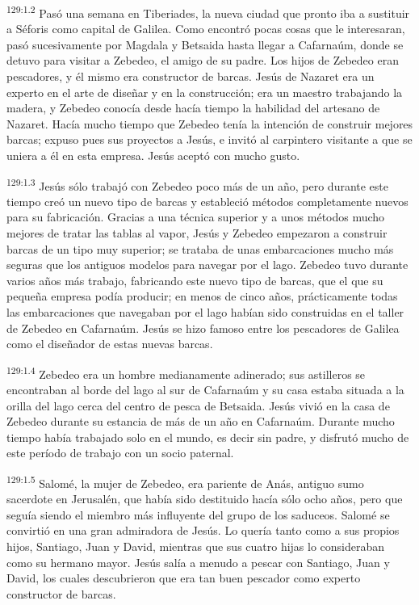 \par
\textsuperscript{129:1.2} Pasó una semana en Tiberiades, la nueva ciudad que pronto iba a sustituir a Séforis como capital de Galilea. Como encontró pocas cosas que le interesaran, pasó sucesivamente por Magdala y Betsaida hasta llegar a Cafarnaúm, donde se detuvo para visitar a Zebedeo, el amigo de su padre. Los hijos de Zebedeo eran pescadores, y él mismo era constructor de barcas. Jesús de Nazaret era un experto en el arte de diseñar y en la construcción; era un maestro trabajando la madera, y Zebedeo conocía desde hacía tiempo la habilidad del artesano de Nazaret. Hacía mucho tiempo que Zebedeo tenía la intención de construir mejores barcas; expuso pues sus proyectos a Jesús, e invitó al carpintero visitante a que se uniera a él en esta empresa. Jesús aceptó con mucho gusto.

\par
\textsuperscript{129:1.3} Jesús sólo trabajó con Zebedeo poco más de un año, pero durante este tiempo creó un nuevo tipo de barcas y estableció métodos completamente nuevos para su fabricación. Gracias a una técnica superior y a unos métodos mucho mejores de tratar las tablas al vapor, Jesús y Zebedeo empezaron a construir barcas de un tipo muy superior; se trataba de unas embarcaciones mucho más seguras que los antiguos modelos para navegar por el lago. Zebedeo tuvo durante varios años más trabajo, fabricando este nuevo tipo de barcas, que el que su pequeña empresa podía producir; en menos de cinco años, prácticamente todas las embarcaciones que navegaban por el lago habían sido construidas en el taller de Zebedeo en Cafarnaúm. Jesús se hizo famoso entre los pescadores de Galilea como el diseñador de estas nuevas barcas.

\par
\textsuperscript{129:1.4} Zebedeo era un hombre medianamente adinerado; sus astilleros se encontraban al borde del lago al sur de Cafarnaúm y su casa estaba situada a la orilla del lago cerca del centro de pesca de Betsaida. Jesús vivió en la casa de Zebedeo durante su estancia de más de un año en Cafarnaúm. Durante mucho tiempo había trabajado solo en el mundo, es decir sin padre, y disfrutó mucho de este período de trabajo con un socio paternal.

\par
\textsuperscript{129:1.5} Salomé, la mujer de Zebedeo, era pariente de Anás, antiguo sumo sacerdote en Jerusalén, que había sido destituido hacía sólo ocho años, pero que seguía siendo el miembro más influyente del grupo de los saduceos. Salomé se convirtió en una gran admiradora de Jesús. Lo quería tanto como a sus propios hijos, Santiago, Juan y David, mientras que sus cuatro hijas lo consideraban como su hermano mayor. Jesús salía a menudo a pescar con Santiago, Juan y David, los cuales descubrieron que era tan buen pescador como experto constructor de barcas.

